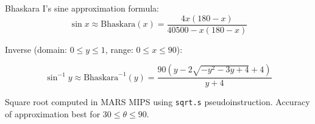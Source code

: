 
Bhaskara I's sine approximation formula:
$$ \sin x \approx \text{Bhaskara}(x) = 
\frac{4 x \left( 180 - x  \right)}
{40500 - x \left( 180 - x \right)}$$

\noindent Inverse (domain: $0 \leq y \leq 1$, range: $0 \leq x \leq 90$):

$$\sin^{-1}y \approx
\text{Bhaskara}^{-1}(y) = \frac
{90 \left(y - 2\sqrt{-y^2 - 3y + 4} +4 \right)}{y+4}$$

\noindent Square root computed in MARS MIPS using \texttt{sqrt.s} pseudoinstruction. 
Accuracy of approximation best
for $30 \leq \theta \leq 90$.